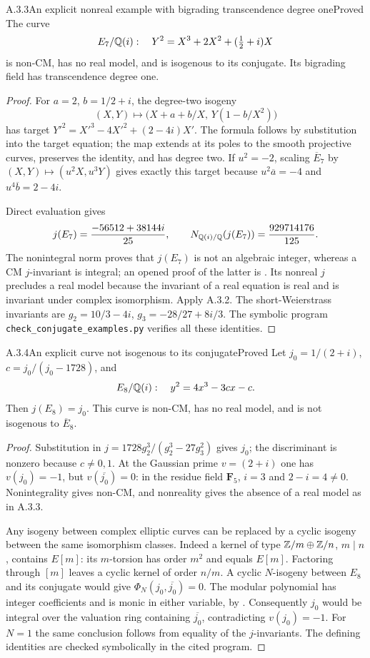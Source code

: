 \begin{result}{A.3.3}{An explicit nonreal example with bigrading transcendence degree one}{Proved}
The curve
\[
 E_7/\mathbb Q(i):\quad Y^2=X^3+2X^2+(\tfrac12+i)X
\]
is non-CM, has no real model, and is isogenous to its conjugate. Its bigrading field has transcendence degree one.
\end{result}
\begin{proof}
For $a=2$, $b=1/2+i$, the degree-two isogeny
\[
 (X,Y)\longmapsto\bigl(X+a+b/X,\,Y(1-b/X^2)\bigr)
\]
has target $Y'^2=X'^3-4X'^2+(2-4i)X'$. The formula follows by substitution into the target equation; the map extends at its poles to the smooth projective curves, preserves the identity, and has degree two. If $u^2=-2$, scaling $\overline E_7$ by $(X,Y)\mapsto(u^2X,u^3Y)$ gives exactly this target because $u^2\overline a=-4$ and $u^4\overline b=2-4i$.

Direct evaluation gives
\[
 j(E_7)=\frac{-56512+38144i}{25},\qquad
 N_{\mathbb Q(i)/\mathbb Q}(j(E_7))=\frac{929714176}{125}.
\]
The nonintegral norm proves that $j(E_7)$ is not an algebraic integer, whereas a CM $j$-invariant is integral; an opened proof of the latter is \cite[Theorem 12.14 and Corollaries 12.15--12.16, pp.119--120]{EllMilneMF}. Its nonreal $j$ precludes a real model because the invariant of a real equation is real and is invariant under complex isomorphism. Apply A.3.2. The short-Weierstrass invariants are $g_2=10/3-4i$, $g_3=-28/27+8i/3$. The symbolic program \texttt{check\_conjugate\_examples.py} verifies all these identities.
\end{proof}

\begin{result}{A.3.4}{An explicit curve not isogenous to its conjugate}{Proved}
Let $j_0=1/(2+i)$, $c=j_0/(j_0-1728)$, and
\[
 E_8/\mathbb Q(i):\quad y^2=4x^3-3cx-c.
\]
Then $j(E_8)=j_0$. This curve is non-CM, has no real model, and is not isogenous to $\overline E_8$.
\end{result}
\begin{proof}
Substitution in $j=1728g_2^3/(g_2^3-27g_3^2)$ gives $j_0$; the discriminant is nonzero because $c\ne0,1$. At the Gaussian prime $v=(2+i)$ one has $v(j_0)=-1$, but $v(\overline{j_0})=0$: in the residue field $\mathbf F_5$, $i=3$ and $2-i=4\ne0$. Nonintegrality gives non-CM, and nonreality gives the absence of a real model as in A.3.3.

Any isogeny between complex elliptic curves can be replaced by a cyclic isogeny between the same isomorphism classes. Indeed a kernel of type $\mathbb Z/m\oplus\mathbb Z/n$, $m\mid n$, contains $E[m]$: its $m$-torsion has order $m^2$ and equals $E[m]$. Factoring through $[m]$ leaves a cyclic kernel of order $n/m$. A cyclic $N$-isogeny between $E_8$ and its conjugate would give $\Phi_N(j_0,\overline{j_0})=0$. The modular polynomial has integer coefficients and is monic in either variable, by \cite[Theorem 6.1 and its proof, pp.82--83]{EllMilneMF}. Consequently $j_0$ would be integral over the valuation ring containing $\overline{j_0}$, contradicting $v(j_0)=-1$. For $N=1$ the same conclusion follows from equality of the $j$-invariants. The defining identities are checked symbolically in the cited program.
\end{proof}

